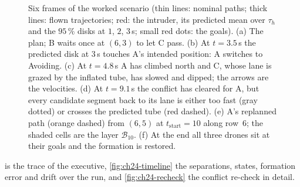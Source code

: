 \begin{figure}[tb]
  \centering
  \caption{Six frames of the worked scenario (thin lines: nominal paths;
  thick lines: flown trajectories; red: the intruder, its predicted mean over
  $\tau_h$ and the $95\,\%$ disks at $1$, $2$, $3$\,s; small red dots: the
  goals). (a) The \cbs plan; B waits once at $(6,3)$ to let C pass.
  (b) At $t = 3.5$\,s the predicted disk at $3$\,s touches A's intended
  position: A switches to Avoiding. (c) At $t = 4.8$\,s A has climbed
  north and C, whose lane is grazed by the inflated tube, has slowed and
  dipped; the arrows are the \orca velocities. (d) At $t = 9.1$\,s the
  conflict has cleared for A, but every candidate segment back to its lane is
  either too fast (gray dotted) or crosses the predicted tube (red dashed).
  (e) A's replanned path (orange dashed) from $(6,5)$ at $t_{\mathrm{start}} = 10$
  along row~6; the shaded cells are the layer $\mathcal{B}_{10}$. (f) At the
  end all three drones sit at their goals and the formation is restored.}
  \label{fig:ch24-scenario}
\end{figure}

 is the trace of the executive, \cref{fig:ch24-timeline}
the separations, states, formation error and drift over the run, and
\cref{fig:ch24-recheck} the conflict re-check in detail.

